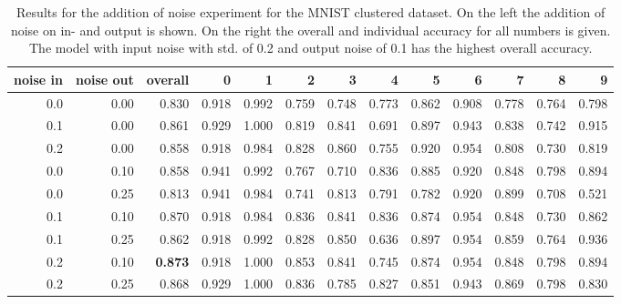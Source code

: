 \documentclass{article}
\begin{document}
\begin{table}[!htb]
	\centering
	\caption{Results for the addition of noise experiment for the MNIST clustered dataset. On the left the addition of noise on in- and output is shown. On the right the overall and individual accuracy for all numbers is given. The model with input noise with std. of 0.2 and output noise of 0.1 has the highest overall accuracy.}
	\begin{tabular}{rr||r|rrrrrrrrrr}
		\toprule
		noise in &  noise out &  overall &      0 &      1 &      2 &      3 &      4 &      5 &      6 &      7 &      8 &      9 \\
		\midrule
		0.0 &       0.00 &    0.830 &  0.918 &  0.992 &  0.759 &  0.748 &  0.773 &  0.862 &  0.908 &  0.778 &  0.764 &  0.798 \\
		0.1 &       0.00 &    0.861 &  0.929 &  1.000 &  0.819 &  0.841 &  0.691 &  0.897 &  0.943 &  0.838 &  0.742 &  0.915 \\
		0.2 &       0.00 &    0.858 &  0.918 &  0.984 &  0.828 &  0.860 &  0.755 &  0.920 &  0.954 &  0.808 &  0.730 &  0.819 \\
		0.0 &       0.10 &    0.858 &  0.941 &  0.992 &  0.767 &  0.710 &  0.836 &  0.885 &  0.920 &  0.848 &  0.798 &  0.894 \\
		0.0 &       0.25 &    0.813 &  0.941 &  0.984 &  0.741 &  0.813 &  0.791 &  0.782 &  0.920 &  0.899 &  0.708 &  0.521 \\
		0.1 &       0.10 &    0.870 &  0.918 &  0.984 &  0.836 &  0.841 &  0.836 &  0.874 &  0.954 &  0.848 &  0.730 &  0.862 \\
		0.1 &       0.25 &    0.862 &  0.918 &  0.992 &  0.828 &  0.850 &  0.636 &  0.897 &  0.954 &  0.859 &  0.764 &  0.936 \\
		0.2 &       0.10 &    \textbf{0.873} &  0.918 &  1.000 &  0.853 &  0.841 &  0.745 &  0.874 &  0.954 &  0.848 &  0.798 &  0.894 \\
		0.2 &       0.25 &    0.868 &  0.929 &  1.000 &  0.836 &  0.785 &  0.827 &  0.851 &  0.943 &  0.869 &  0.798 &  0.830 \\
		\bottomrule
	\end{tabular}
	\label{table:MNIST_clustered_results}
\end{table}
\end{document}
